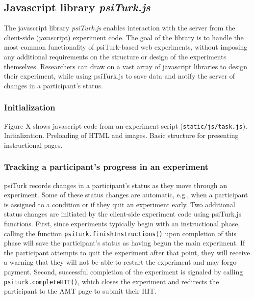 \documentclass[twocolumn]{svjour3}          %
\begin{document}
%
%
%
%
%



\subsection{Javascript library \emph{psiTurk.js}}

The javascript library \emph{psiTurk.js} enables interaction with the server from the client-side (javascript) experiment code.
The goal of the library is to handle the most common functionality of psiTurk-based web experiments, without imposing any additional requirements on the structure or design of the experiments themselves.
Researchers can draw on a vast array of javascript libraries to design their experiment, while using psiTurk.js to save data and notify the server of changes in a participant's status.

\subsubsection{Initialization}

Figure X shows javascript code from an experiment script (\texttt{static/js/task.js}). 
Initialization. 
Preloading of HTML and images.
Basic structure for presenting instructional pages.

\subsubsection{Tracking a participant's progress in an experiment} 

psiTurk records changes in a participant's status as they move through an experiment. 
Some of these status changes are automatic, e.g., when a participant is assigned to a condition or if they quit an experiment early. 
Two additional status changes are initiated by the client-side experiment code using psiTurk.js functions.
First, since experiments typically begin with an instructional phase, calling the function \texttt{psiturk.finishInstructions()} upon completion of this phase will save the participant's status as having begun the main experiment.
If the participant attempts to quit the experiment after that point, they will receive a warning that they will not be able to restart the experiment and may forgo payment.
Second, successful completion of the experiment is signaled by calling \texttt{psiturk.completeHIT()}, which closes the experiment and redirects the participant to the AMT page to submit their HIT.
\end{document}
